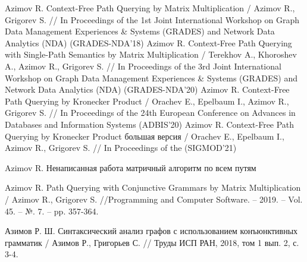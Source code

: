 
\begin{thebibliography}{99}
	 Azimov R. Context-Free Path Querying by
	Matrix Multiplication / Azimov R., Grigorev S. // In Proceedings of the
	1st Joint International Workshop on Graph Data Management Experiences \&
	Systems (GRADES) and Network Data Analytics (NDA) (GRADES-NDA’18)
	 Azimov R. Context-Free Path Querying with Single-Path Semantics by
	Matrix Multiplication / Terekhov A., Khoroshev A., Azimov R., Grigorev S. // In Proceedings of the
	3rd Joint International Workshop on Graph Data Management Experiences \&
	Systems (GRADES) and Network Data Analytics (NDA) (GRADES-NDA’20)
	 Azimov R. Context-Free Path Querying by Kronecker
	Product / Orachev E., Epelbaum I., Azimov R., Grigorev S. // In Proceedings of the
	24th European Conference on Advances in Databases and Information Systems (ADBIS’20)
	 Azimov R. Context-Free Path Querying by Kronecker
	Product большая версия / Orachev E., Epelbaum I., Azimov R., Grigorev S. // In Proceedings of the (SIGMOD’21)
	
	 Azimov R. Ненаписанная работа матричный алгоритм по всем путям
	
	 Azimov R. Path Querying with Conjunctive Grammars by Matrix Multiplication / Azimov R., Grigorev S. //Programming and Computer Software. – 2019. – Vol. 45. – №. 7. – pp. 357-364.
	\setcounter{firstbib}{\value{enumiv}}
	
	 Азимов Р. Ш. Синтаксический анализ графов с использованием конъюнктивных грамматик / Азимов Р., Григорьев С. // Труды ИСП РАН, 2018, том 1 вып. 2, с. 3-4.
	
\end{thebibliography}